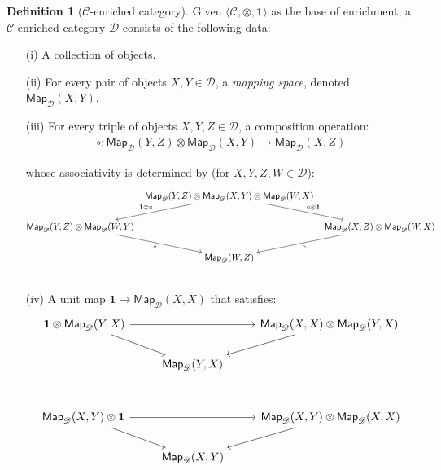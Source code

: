 \documentclass[10pt]{amsart}
\newcommand{\8}{\ensuremath{\infty}}
\newcommand{\0}{\ensuremath{\overset{\rightarrow}{0}}}
\newcommand{\1}{\ensuremath{\mathbf{1}}}
\newcommand{\C}{\ensuremath{\mathscr{C}}}
\newcommand{\D}{\ensuremath{\mathscr{D}}}
\newcommand{\Map}{\ensuremath{\mathsf{Map}}}
\newcommand{\langrang}[1]{\ensuremath{\langle {#1} \rangle}}
\theoremstyle{definition}
\newtheorem{definition}{Definition}[section]
\numberwithin{definition}{subsection}
\numberwithin{definition}{section}
\begin{document}
\begin{definition}[\C-enriched category]
  Given $\langrang{\C, \otimes, \1}$ as the base of enrichment, a \C-enriched category $\D$ consists of the following data:

  \begin{enumerate}
    \item[(i)] A collection of objects.
    \item[(ii)] For every pair of objects $X, Y \in \D$, a \emph{mapping space}, denoted $\Map_\D(X, Y)$.
    \item[(iii)] For every triple of objects $X, Y, Z \in \D$, a composition operation:
      \begin{align*}
        \circ : \Map_\D(Y, Z) \otimes \Map_\D(X, Y) \rightarrow \Map_\D(X, Z)
      \end{align*}

      whose associativity is determined by (for $X, Y, Z, W \in \D$):

      \begin{equation*}
        \begin{tikzcd}[cramped, column sep=tiny]
          & \Map_\D(Y, Z) \otimes \Map_\D(X, Y) \otimes \Map_\D(W, X) \arrow[dl, "\1 \otimes \circ"'] \arrow[dr, "\circ \otimes \1"] & \\
          \Map_\D(Y, Z) \otimes \Map_\D(W, Y) \arrow[dr, "\circ"'] & & \Map_\D(X, Z) \otimes \Map_\D(W, X) \arrow[dl, "\circ"] \\
          & \Map_\D(W, Z) & \\
        \end{tikzcd}
      \end{equation*}

    \item[(iv)] A unit map $\1 \rightarrow \Map_\D(X, X)$ that satisfies:
      \begin{equation*}
        \begin{tikzcd}
          \1 \otimes \Map_\D(Y, X) \arrow[rr] \arrow[dr] & & \Map_\D(X, X) \otimes \Map_\D(Y, X) \arrow[dl] \\
          & \Map_\D(Y, X) & \\
        \end{tikzcd}
      \end{equation*}

      \begin{equation*}
        \begin{tikzcd}
          \Map_\D(X, Y) \otimes \1 \arrow[rr] \arrow[dr] & & \Map_\D(X, Y) \otimes \Map_\D(X, X) \arrow[dl] \\
          & \Map_\D(X, Y) & \\
        \end{tikzcd}
      \end{equation*}
  \end{enumerate}
\end{definition}
\end{document}
